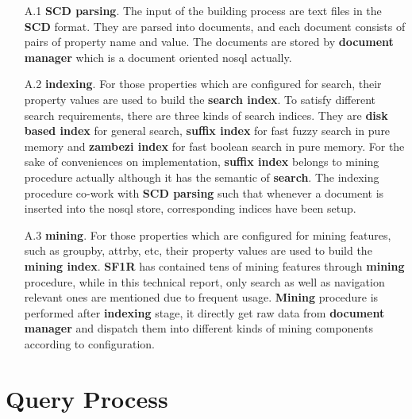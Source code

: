 \begin{enumerate}
\item[A.1] \textbf{SCD parsing}. The input of the building process are text files in the \textbf{SCD} format.
They are parsed into documents, and each document consists of pairs of property name and value. The documents are stored by \textbf{document manager} which
is a document oriented nosql actually.

\item[A.2] \textbf{indexing}. For those properties which are configured for search, their property values are used to build the \textbf{search index}.
To satisfy different search requirements, there are three kinds of search indices. They are \textbf{disk based index} for general search,
\textbf{suffix index} for fast fuzzy search in pure memory and \textbf{zambezi index} for fast boolean search in pure memory. For the sake of 
conveniences on implementation, \textbf{suffix index} belongs to mining procedure actually although it has the semantic of \textbf{search}. The indexing
procedure co-work with \textbf{SCD parsing} such that whenever a document is inserted into the nosql store, corresponding indices have been setup.

\item[A.3] \textbf{mining}. For those properties which are configured for mining features, such as groupby, attrby, etc,
their property values are used to build the \textbf{mining index}. \textbf{SF1R} has contained tens of mining features through \textbf{mining} procedure,
while in this technical report, only search as well as navigation relevant ones are mentioned due to frequent usage. \textbf{Mining} procedure is performed
after \textbf{indexing} stage, it directly get raw data from \textbf{document manager} and dispatch them into different kinds of mining components according
to configuration.

\end{enumerate}

\section{Query Process}

